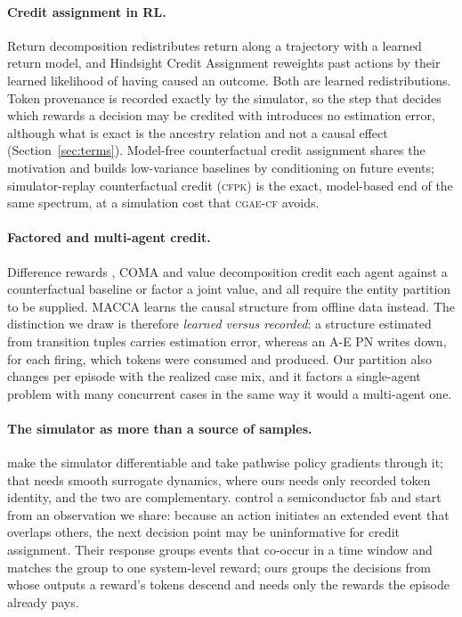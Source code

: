 \documentclass[review,authoryear,3p,times]{elsarticle}
\newcommand{\cflow}{\textsc{cgae-cf}}          %
\newcommand{\cfpk}{\textsc{cfpk}}
\begin{document}
\paragraph{Credit assignment in RL.} Return decomposition \citep{rudder2019}
redistributes return along a trajectory with a learned return model, and
Hindsight Credit Assignment \citep{hca2019} reweights past actions by their
learned likelihood of having caused an outcome. Both are learned
redistributions. Token provenance is recorded exactly by the simulator, so the
step that decides which rewards a decision may be credited with introduces no
estimation error, although what is exact is the ancestry relation and not a
causal effect (Section~\ref{sec:terms}). Model-free counterfactual credit
assignment \citep{ccadeep2021} shares the motivation and builds low-variance
baselines by conditioning on future events; simulator-replay counterfactual
credit (\cfpk{}) is the exact, model-based end of the same spectrum, at a
simulation cost that \cflow{} avoids.

\paragraph{Factored and multi-agent credit.} Difference rewards
\citep{difference2002}, COMA \citep{coma2018} and value decomposition
\citep{vdn2018,qmix2018} credit each agent against a counterfactual baseline
or factor a joint value, and all require the entity partition to be supplied.
MACCA \citep{macca2024} learns the causal structure from offline data instead.
The distinction we draw is therefore \emph{learned versus recorded}: a
structure estimated from transition tuples carries estimation error, whereas an
A-E PN writes down, for each firing, which tokens were consumed and produced.
Our partition also changes per episode with the realized case mix, and it
factors a single-agent problem with many concurrent cases in the same way it
would a multi-agent one.

\paragraph{The simulator as more than a source of samples.}
\citet{diffdes2024} make the simulator differentiable and take pathwise policy
gradients through it; that needs smooth surrogate dynamics, where ours needs
only recorded token identity, and the two are complementary.
\citet{eventdriven2026} control a semiconductor fab and start from an
observation we share: because an action initiates an extended event that
overlaps others, the next decision point may be uninformative for credit
assignment. Their response groups events that co-occur in a time window and
matches the group to one system-level reward; ours groups the decisions from
whose outputs a reward's tokens descend and needs only the rewards the episode
already pays.
\end{document}
